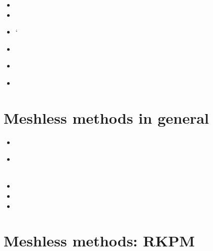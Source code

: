 \begin{scriptsize}
\begin{itemize}
\\
\\
\\
\item[\twothousandtwelve]
\item[\twothousandthirteen]
\item[\twothousandfifteen]
`
\item[\twothousandsixteen]
\item[\twothousandeighteen]
\\
\item[\twothousandtwentythree]
\end{itemize}
\end{scriptsize}


\section{Meshless methods in general}

\begin{scriptsize}
\begin{itemize}
\item[\nineteenninetysix]
\item[\twothousand]
\\ 
\\
\item[\twothousandone]
\item[\twothousandtwo]
\item[\twothousandfour]
\end{itemize}
\end{scriptsize}


\section{Meshless methods: RKPM}

